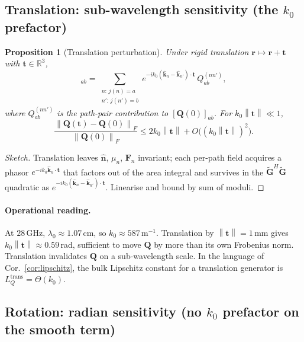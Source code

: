 \documentclass[11pt,a4paper]{article}
\newtheorem{proposition}[theorem]{Proposition}
\theoremstyle{definition}
\newcommand{\rr}{\mathbf{r}}
\newcommand{\nh}{\hat{\mathbf{n}}}
\newcommand{\kh}{\hat{\mathbf{k}}}
\newcommand{\Q}{\mathbf{Q}}
\newcommand{\Gt}{\widetilde{\mathbf{G}}}
\newcommand{\F}{\mathbf{F}}
\newcommand{\R}{\mathbb{R}}
\newcommand{\norm}[1]{\left\lVert #1 \right\rVert}
\begin{document}
\subsection{Translation: sub-wavelength sensitivity (the \texorpdfstring{$k_0$}{k0} prefactor)}

\begin{proposition}[Translation perturbation]
\label{prop:translation}
Under rigid translation $\rr\mapsto\rr+\mathbf{t}$ with $\mathbf{t}\in\R^3$,
\begin{equation}
  [\Q(\mathbf{t})]_{ab} =
  \sum_{\substack{n:\,j(n)=a\\n':\,j(n')=b}}
  e^{-ik_0(\kh_n-\kh_{n'})\cdot\mathbf{t}}\,Q^{(nn')}_{ab},
  \label{eq:Q-trans}
\end{equation}
where $Q^{(nn')}_{ab}$ is the path-pair contribution to $[\Q(0)]_{ab}$.
For $k_0\norm{\mathbf{t}}\ll 1$,
\begin{equation}
  \frac{\norm{\Q(\mathbf{t})-\Q(0)}_F}{\norm{\Q(0)}_F}
  \le 2 k_0\norm{\mathbf{t}} + O\bigl((k_0\norm{\mathbf{t}})^2\bigr).
  \label{eq:Q-trans-bound}
\end{equation}
\end{proposition}

\begin{proof}[Sketch]
Translation leaves $\nh$, $\mu_n$, $\F_n$ invariant; each per-path field
acquires a phasor $e^{-ik_0\kh_n\cdot\mathbf{t}}$ that factors out of
the area integral and survives in the $\Gt^H\Gt$ quadratic as
$e^{-ik_0(\kh_n-\kh_{n'})\cdot\mathbf{t}}$. Linearise and bound by sum
of moduli.
\end{proof}

\paragraph{Operational reading.}
At $28$\,GHz, $\lambda_0\!\approx\!1.07$\,cm, so $k_0\!\approx\!587$\,m$^{-1}$.
Translation by $\norm{\mathbf{t}}=1$\,mm gives
$k_0\norm{\mathbf{t}}\!\approx\!0.59$\,rad, sufficient to move $\Q$ by
more than its own Frobenius norm. Translation invalidates $\Q$ on a
sub-wavelength scale. In the language of
Cor.~\ref{cor:lipschitz}, the bulk Lipschitz constant for a translation
generator is $L_Q^{\mathrm{trans}}\!=\!\Theta(k_0)$.

\subsection{Rotation: radian sensitivity (no \texorpdfstring{$k_0$}{k0} prefactor on the smooth term)}
\end{document}
